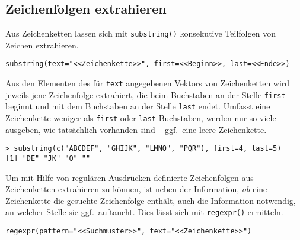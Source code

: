 \subsection{Zeichenfolgen extrahieren}
\label{sec:substring}

Aus Zeichenketten lassen sich mit \lstinline!substring()! konsekutive Teilfolgen von Zeichen extrahieren.
\begin{lstlisting}
substring(text="<<Zeichenkette>>", first=<<Beginn>>, last=<<Ende>>)
\end{lstlisting}

Aus den Elementen des für \lstinline!text! angegebenen Vektors von Zeichenketten wird jeweils jene Zeichenfolge extrahiert, die beim Buchstaben an der Stelle \lstinline!first! beginnt und mit dem Buchstaben an der Stelle \lstinline!last! endet. Umfasst eine Zeichenkette weniger als \lstinline!first! oder \lstinline!last! Buchstaben, werden nur so viele ausgeben, wie tatsächlich vorhanden sind -- ggf.\ eine leere Zeichenkette.
\begin{lstlisting}
> substring(c("ABCDEF", "GHIJK", "LMNO", "PQR"), first=4, last=5)
[1] "DE" "JK" "O" ""
\end{lstlisting}

Um mit Hilfe von regulären Ausdrücken definierte Zeichenfolgen aus Zeichenketten extrahieren zu können, ist neben der Information, \emph{ob} eine Zeichenkette die gesuchte Zeichenfolge enthält, auch die Information notwendig, an welcher Stelle sie ggf.\ auftaucht. Dies lässt sich mit  \lstinline!regexpr()! ermitteln.
\begin{lstlisting}
regexpr(pattern="<<Suchmuster>>", text="<<Zeichenkette>>")
\end{lstlisting}

